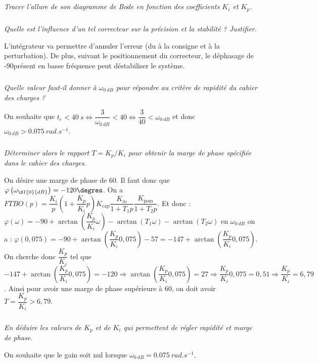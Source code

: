 \begin{multicols}{2}
\subparagraph{}
\textit{Tracer l’allure de son diagramme de Bode en fonction des coefficients $K_i$ et $K_p$.}
\ifprof
\begin{corrige}

\end{corrige}
\else
\fi

\subparagraph{}
\textit{Quelle est l’influence d’un tel correcteur sur la précision et la stabilité ? Justifier.}
\ifprof
\begin{corrige}
L'intégrateur va permettre d'annuler l'erreur (du à la consigne et à la perturbation).
De plus, suivant le positionnement du correcteur, le déphasage de -90\degres présent en basse fréquence peut déstabiliser le système.
\end{corrige}
\else
\fi

\subparagraph{}
\textit{Quelle valeur faut-il donner à $\omega_{\SI{0}{dB}}$ pour répondre au critère de rapidité du cahier des charges ?}
\ifprof
\begin{corrige}
On souhaite que $t_e<\SI{40}{s} \Leftrightarrow \dfrac{3}{\omega_{\SI{0}{dB}}}<40 \Leftrightarrow \dfrac{3}{40}<\omega_{\SI{0}{dB}}$ et donc $\omega_{\SI{0}{dB}}>\SI{0,075}{rad.s^{-1}}$.
\end{corrige}
\else
\fi

\subparagraph{}
\textit{Déterminer alors le rapport $T=K_p/K_i$ pour obtenir la marge de phase spécifiée dans le cahier des charges.} 
\ifprof
\begin{corrige}
On désire une marge de phase de 60\degres. Il faut donc que $\varphi\left( \omega_{\SI{0}{dB}}\right)=-120\degres$.
On a $FTBO(p)=\dfrac{K_i}{p}\left(1+\dfrac{K_p}{K_i} p\right)K_{\text{cap}}\dfrac{K_m}{1+T_1p}\dfrac{K_{\text{pom}}}{1+T_2p}$. Et donc :
$\varphi(\omega)=-90+\arctan\left( \dfrac{K_p}{K_i}\omega \right)-\arctan\left( T_1\omega \right)-\arctan\left( T_2\omega \right)$ en $\omega_{\SI{0}{dB}}$ on a : $\varphi(0,075)=-90+\arctan\left( \dfrac{K_p}{K_i}0,075\right)-57=-147+\arctan\left( \dfrac{K_p}{K_i}0,075\right)$. On cherche donc $\dfrac{K_p}{K_i}$ tel que $-147+\arctan\left( \dfrac{K_p}{K_i}0,075\right)=-120 \Rightarrow \arctan\left( \dfrac{K_p}{K_i}0,075\right)=27\Rightarrow \dfrac{K_p}{K_i}0,075 = 0,51 \Rightarrow \dfrac{K_p}{K_i}= 6,79$. Ainsi pour avoir une marge de phase supérieure à 60\degres, on doit avoir $T=\dfrac{K_p}{K_i}> 6,79$.
\end{corrige}
\else
\fi


\subparagraph{}
\textit{En déduire les valeurs de $K_p$ et de $K_i$ qui permettent de régler rapidité et marge de phase.}
\ifprof
\begin{corrige}
On souhaite que le gain soit nul lorsque $\omega_{\SI{0}{dB}}=\SI{0,075}{rad.s^{-1}}$. 


\end{corrige}
\end{multicols}
